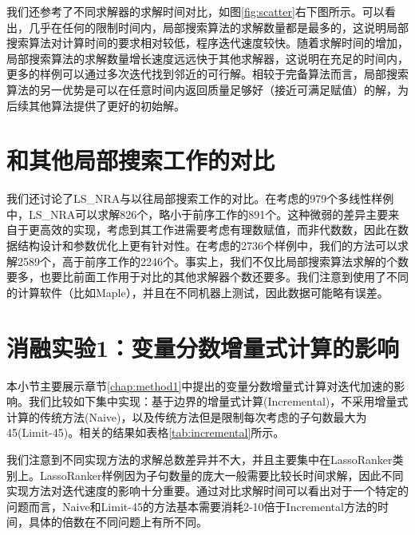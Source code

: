 我们还参考了不同求解器的求解时间对比，如图\ref{fig:scatter}右下图所示。可以看出，几乎在任何的限制时间内，局部搜索算法的求解数量都是最多的，这说明局部搜索算法对计算时间的要求相对较低，程序迭代速度较快。随着求解时间的增加，局部搜索算法的求解数量增长速度远远快于其他求解器，这说明在充足的时间内，更多的样例可以通过多次迭代找到邻近的可行解。相较于完备算法而言，局部搜索算法的另一优势是可以在任意时间内返回质量足够好（接近可满足赋值）的解，为后续其他算法提供了更好的初始解。



\section{和其他局部搜索工作的对比}
我们还讨论了LS\_NRA与以往局部搜索工作的对比。在\cite{multilinear}考虑的979个多线性样例中，LS\_NRA可以求解826个，略小于前序工作的891个。这种微弱的差异主要来自于\cite{multilinear}更高效的实现，考虑到其工作进需要考虑有理数赋值，而非代数数，因此在数据结构设计和参数优化上更有针对性。在\cite{LiXZ23}考虑的2736个样例中，我们的方法可以求解2589个，高于前序工作的2246个。事实上，我们不仅比局部搜索算法求解的个数要多，也要比前面工作用于对比的其他求解器个数还要多。我们注意到\cite{LiXZ23}使用了不同的计算软件（比如Maple），并且在不同机器上测试，因此数据可能略有误差。


\section{消融实验1：变量分数增量式计算的影响}
本小节主要展示章节\ref{chap:method1}中提出的变量分数增量式计算对迭代加速的影响。我们比较如下集中实现：基于边界的增量式计算(Incremental)，不采用增量式计算的传统方法(Naive)，以及传统方法但是限制每次考虑的子句数最大为45(Limit-45)。相关的结果如表格\ref{tab:incremental}所示。

我们注意到不同实现方法的求解总数差异并不大，并且主要集中在LassoRanker类别上。LassoRanker样例因为子句数量的庞大一般需要比较长时间求解，因此不同实现方法对迭代速度的影响十分重要。通过对比求解时间可以看出对于一个特定的问题而言，Naive和Limit-45的方法基本需要消耗2-10倍于Incremental方法的时间，具体的倍数在不同问题上有所不同。

